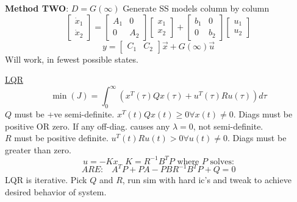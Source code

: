 \documentclass[twocolumn]{article}    %
\begin{document}
\noindent
\textbf{Method TWO}: \hspace{60pt} \(D = G(\infty)\)
Generate SS models column by column
\begin{equation*}
    \begin{bmatrix}
        \Dot{x}_1 \\ \Dot{x}_2
    \end{bmatrix} = \begin{bmatrix}
        A_1 & 0\\ 0 & A_2
    \end{bmatrix}
    \begin{bmatrix}
        x_1 \\ x_2
    \end{bmatrix} + \begin{bmatrix}
        b_1 & 0\\ 0 & b_2
    \end{bmatrix} \begin{bmatrix}
        u_1 \\ u_2
    \end{bmatrix}
\end{equation*}
\begin{equation*}
    y = \begin{bmatrix}
        C_1 & C_2
    \end{bmatrix} \Vec{x} + G(\infty)\Vec{u}
\end{equation*}
Will work, in fewest possible states.


    \noindent
    \underline{LQR}
    \begin{equation*}
        \min(J) = \int_0^\infty (x^T(\tau)Qx(\tau) + u^T(\tau)Ru(\tau))d\tau
    \end{equation*}
    \(Q\) must be +ve semi-definite. \(x^T(t)Qx(t) \geq 0 \forall x(t) \neq 0\). Diags must be positive OR zero. If any off-diag. causes any \(\lambda=0\), not semi-definite.\\
    \(R\) must be positive definite. \(u^T(t)Ru(t) > 0 \forall u(t) \neq 0\). Diags must be greater than zero.
    \begin{equation*}
        u = -Kx \hspace{10pt} K = R^{-1} B^T P \text{ where } P \text{ solves:}
    \end{equation*}
    \begin{equation*}
        ARE: \hspace{10pt} A^TP + PA - PBR^{-1}B^TP + Q =0
    \end{equation*}
    LQR is iterative. Pick \(Q\) and \(R\), run sim with hard ic's and tweak to achieve desired behavior of system.
    
\end{document}
